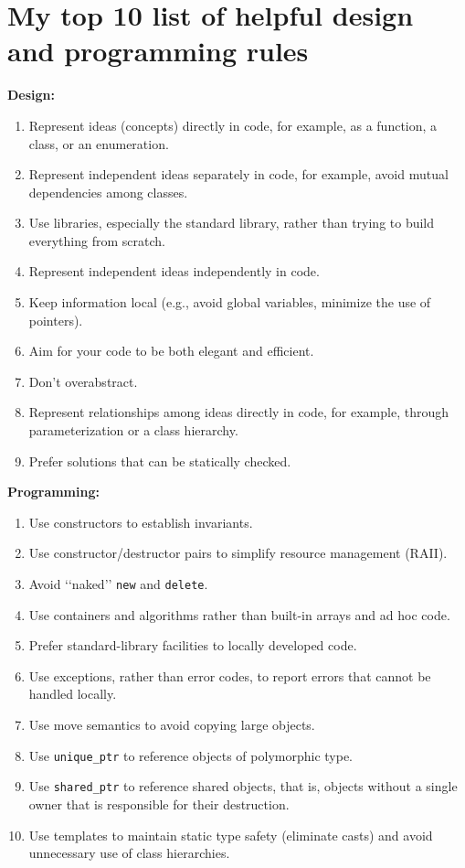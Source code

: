 \documentclass{article}
\begin{document}
\section*{My top 10 list of helpful design and programming rules}
\textbf{Design:}
 \begin{enumerate}
  \item  Represent ideas (concepts) directly in code, for example, as a function, a class, or an enumeration.
  \item  Represent independent ideas separately in code, for example, avoid mutual dependencies among classes.
  \item  Use libraries, especially the standard library, rather than trying to build everything from scratch.
  \item  Represent independent ideas independently in code.
  \item  Keep information local (e.g., avoid global variables, minimize the use of pointers).
  \item  Aim for your code to be both elegant and efficient.
  \item  Don’t overabstract.
  \item  Represent relationships among ideas directly in code, for example, through parameterization or a class hierarchy.
  \item  Prefer solutions that can be statically checked.
 \end{enumerate}
 
\textbf{Programming:}
\begin{enumerate}
 \item Use constructors to establish invariants.
 \item Use constructor/destructor pairs to simplify resource management (RAII).
 \item Avoid ‘‘naked’’ \texttt{new} and \texttt{delete}.
 \item Use containers and algorithms rather than built-in arrays and ad hoc code.
 \item Prefer standard-library facilities to locally developed code.
 \item Use exceptions, rather than error codes, to report errors that cannot be handled locally.
 \item Use move semantics to avoid copying large objects.
 \item Use \texttt{unique\_ptr} to reference objects of polymorphic type.
 \item Use \texttt{shared\_ptr} to reference shared objects, that is, objects without a single owner that is responsible for their destruction.
 \item Use templates to maintain static type safety (eliminate casts) and avoid unnecessary use of class hierarchies.
\end{enumerate}
\end{document}
